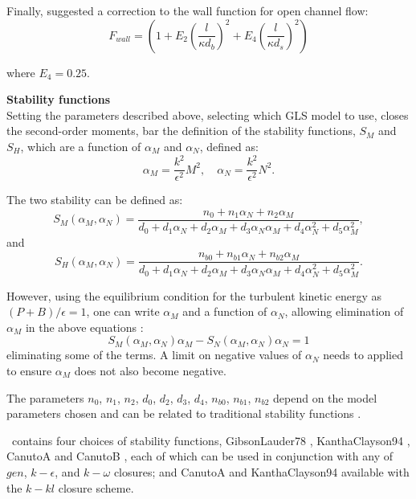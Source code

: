Finally, \citet{blumberg1992} suggested a correction to the wall function for open channel flow:
\begin{equation}
F_{wall} = \left(1+E_2 \left(\frac{l}{\kappa d_b}\right)^2 + E_4 \left(\frac{l}{\kappa d_s}\right)^2\right)
\end{equation}

\noindent
where $E_4=0.25$.

\par{\textbf{Stability functions}\\}
Setting the parameters described above, \ie selecting which GLS model to use, closes the second-order
moments, bar the definition of the stability functions, $S_M$ and $S_H$,
which are a function of $\alpha_M$ and $\alpha_N$, defined as:
\begin{equation*}
\alpha_M=\frac{k^2}{\epsilon^2}M^2, \quad
\alpha_N=\frac{k^2}{\epsilon^2}N^2.
\end{equation*}

The two stability can be defined as:
\begin{equation*}
S_M(\alpha_M,\alpha_N) = \frac{n_0+n_1\alpha_N+n_2\alpha_M}{d_0+d_1\alpha_N+d_2\alpha_M+d_3\alpha_N\alpha_M+d_4\alpha_N^2+d_5\alpha_M^2},
\end{equation*}
and
\begin{equation*}
S_H(\alpha_M,\alpha_N) = \frac{n_{b0}+n_{b1}\alpha_N+n_{b2}\alpha_M}{d_0+d_1\alpha_N+d_2\alpha_M+d_3\alpha_N\alpha_M+d_4\alpha_N^2+d_5\alpha_M^2}.
\end{equation*}

However, using the equilibrium condition for the turbulent kinetic energy as $(P+B)/\epsilon=1$, one can write
$\alpha_M$ and a function of $\alpha_N$, allowing elimination of $\alpha_M$ in the above equations \citep{umlauf2005}:
\begin{equation*}
S_M(\alpha_M,\alpha_N)\alpha_M - S_N(\alpha_M,\alpha_N)\alpha_N=1
\end{equation*}
eliminating some of the terms. A limit on negative values of $\alpha_N$ needs to applied to ensure $\alpha_M$ does not also become negative.

The parameters $n_0$, $n_1$, $n_2$, $d_0$, $d_2$, $d_3$, $d_4$, $n_{b0}$, $n_{b1}$, $n_{b2}$ depend on
the model parameters chosen and can be related to traditional stability functions \citep{umlauf2005}.

\fluidity\ contains four choices of stability functions, GibsonLauder78 \citep{gibson1978}, KanthaClayson94 \citep{kantha1994}, CanutoA and CanutoB \citep{canuto2001},
each of which can be used in conjunction with any of $gen$, $k-\epsilon$, and $k-\omega$ closures; and CanutoA and KanthaClayson94 available with the $k-kl$ 
closure scheme.

